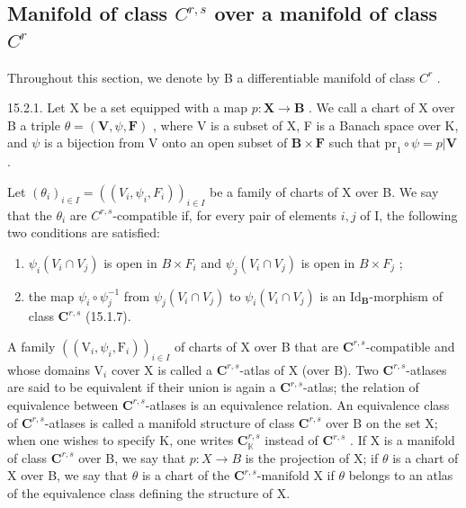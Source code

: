 \subsection{\texorpdfstring{Manifold of class \(C^{r,s}\) over a manifold of class \(C^{r}\)}{Manifold of class C\^{}\{r,s\} over a manifold of class C\^{}\{r\}}}

Throughout this section, we denote by B a differentiable manifold of class \(C^{r}\) .

15.2.1. Let X be a set equipped with a map \(p: \mathbf{X} \to \mathbf{B}\) . We call a chart of X over B a triple \(\theta = (\mathbf{V}, \psi, \mathbf{F})\) , where V is a subset of X, F is a Banach space over K, and \(\psi\) is a bijection from V onto an open subset of \(\mathbf{B} \times \mathbf{F}\) such that \(\mathrm{pr}_1 \circ \psi = p|\mathbf{V}\) .

Let \((\theta_{i})_{i\in I} = ((V_{i},\psi_{i},F_{i}))_{i\in I}\) be a family of charts of X over B. We say that the \(\theta_{i}\) are \(C^{r,s}\)-compatible if, for every pair of elements \(i,j\) of I, the following two conditions are satisfied:

\begin{enumerate}
\def\labelenumi{\alph{enumi})}
\item
  \(\psi_i(V_i \cap V_j)\) is open in \(B \times F_i\) and \(\psi_j(V_i \cap V_j)\) is open in \(B \times F_j\) ;
\item
  the map \(\psi_i\circ\psi_j^{-1}\) from \(\psi_j(V_i\cap V_j)\) to \(\psi_i(V_i\cap V_j)\) is an \(\mathrm{Id}_{\mathbf{B}}\)-morphism of class \(\mathbf{C}^{r,s}\) (15.1.7).
\end{enumerate}

A family \(((\mathrm{V}_i,\psi_i,\mathrm{F}_i))_{i\in I}\) of charts of X over B that are \(\mathbf{C}^{r,s}\)-compatible and whose domains \(\mathrm{V}_i\) cover X is called a \(\mathbf{C}^{r,s}\)-atlas of X (over B). Two \(\mathbf{C}^{r,s}\)-atlases are said to be equivalent if their union is again a \(\mathbf{C}^{r,s}\)-atlas; the relation of equivalence between \(\mathbf{C}^{r,s}\)-atlases is an equivalence relation. An equivalence class of \(\mathbf{C}^{r,s}\)-atlases is called a manifold structure of class \(\mathbf{C}^{r,s}\) over B on the set X; when one wishes to specify K, one writes \(\mathbf{C}_{\mathbb{K}}^{r,s}\) instead of \(\mathbf{C}^{r,s}\) . If X is a manifold of class \(\mathbf{C}^{r,s}\) over B, we say that \(p\colon X\to B\) is the projection of X; if \(\theta\) is a chart of X over B, we say that \(\theta\) is a chart of the \(\mathbf{C}^{r,s}\)-manifold X if \(\theta\) belongs to an atlas of the equivalence class defining the structure of X.

